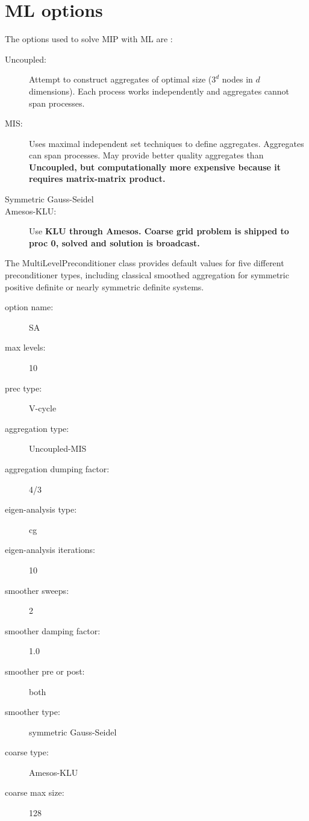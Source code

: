 \appendix
\section{ML options}
The options used to solve MIP with ML are \cite{ml_guide}:
\begin{description}
\item [Uncoupled:] Attempt to construct aggregates of optimal size ($3^d$
nodes in $d$ dimensions). Each process works independently and aggregates
cannot span processes.
\item [MIS:] Uses maximal independent set techniques \cite{mis} to define
aggregates. Aggregates can span processes. May provide better quality
aggregates than \bf{Uncoupled}, but computationally more expensive because it
requires matrix-matrix product.
\item[Symmetric Gauss-Seidel]
\item[Amesos-KLU:] Use \bf{KLU} through \bf{Amesos}. Coarse grid problem is
shipped to proc 0, solved and solution is broadcast.
\end{description}
The MultiLevelPreconditioner class provides default values for five different
preconditioner types, including classical smoothed aggregation for symmetric
positive definite or nearly symmetric definite systems.
\begin{description}
\item [option name:] SA
\item [max levels:] 10
\item [prec type:] V-cycle
\item [aggregation type:] Uncoupled-MIS
\item [aggregation dumping factor:] 4/3
\item [eigen-analysis type:] cg
\item [eigen-analysis iterations:] 10
\item [smoother sweeps:] 2
\item [smoother damping factor:] 1.0
\item [smoother pre or post:] both
\item [smoother type:] symmetric Gauss-Seidel
\item [coarse type:] Amesos-KLU
\item [coarse max size:] 128
\end{description}
